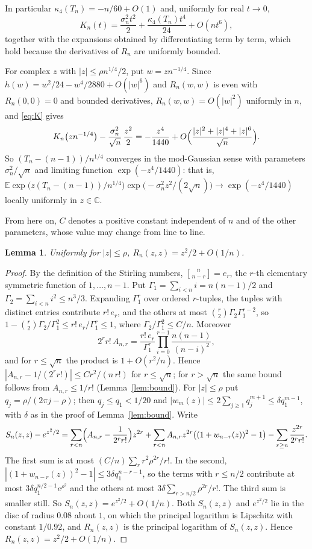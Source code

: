 \documentclass[11pt]{amsart}
\newtheorem{lemma}[theorem]{Lemma}
\theoremstyle{remark}
\newcommand{\E}{\mathbb{E}}
\newcommand{\stirl}[2]{\genfrac{[}{]}{0pt}{}{#1}{#2}}
\begin{document}
In particular $\kappa_4(T_n)=-n/60+O(1)$ and, uniformly for real $t\to0$,
\begin{equation}\label{eq:Kexp}
K_n(t)=\frac{\sigma_n^2t^2}2+\frac{\kappa_4(T_n)t^4}{24}+O(nt^6),
\end{equation}
together with the expansions obtained by differentiating term by term, which hold because the derivatives of $R_n$ are uniformly bounded.

For complex $z$ with $|z|\le\rho n^{1/4}/2$, put $w=zn^{-1/4}$. Since $h(w)=w^2/24-w^4/2880+O(|w|^6)$ and $R_n(w,w)$ is even with $R_n(0,0)=0$ and bounded derivatives, $R_n(w,w)=O(|w|^2)$ uniformly in $n$, and \eqref{eq:K} gives
\[
K_n\bigl(zn^{-1/4}\bigr)-\frac{\sigma_n^2}{\sqrt n}\,\frac{z^2}2=-\frac{z^4}{1440}+O\Bigl(\frac{|z|^2+|z|^4+|z|^6}{\sqrt n}\Bigr).
\]
So $(T_n-(n-1))/n^{1/4}$ converges in the mod-Gaussian sense with parameters $\sigma_n^2/\sqrt n$ and limiting function $\exp(-z^4/1440)$: that is, $\E\exp\bigl(z(T_n-(n-1))/n^{1/4}\bigr)\exp\bigl(-\sigma_n^2z^2/(2\sqrt n)\bigr)\to\exp(-z^4/1440)$ locally uniformly in $z\in\mathbb{C}$.

From here on, $C$ denotes a positive constant independent of $n$ and of the other parameters, whose value may change from line to line.

\begin{lemma}\label{lem:rate}
Uniformly for $|z|\le\rho$, $R_n(z,z)=z^2/2+O(1/n)$.
\end{lemma}

\begin{proof}
By the definition of the Stirling numbers, $\stirl{n}{n-r}=e_r$, the $r$-th elementary symmetric function of $1,\dots,n-1$. Put $\Gamma_1=\sum_{i<n}i=n(n-1)/2$ and $\Gamma_2=\sum_{i<n}i^2\le n^3/3$. Expanding $\Gamma_1^r$ over ordered $r$-tuples, the tuples with distinct entries contribute $r!\,e_r$, and the others at most $\binom r2\Gamma_2\Gamma_1^{r-2}$, so $1-\binom r2\Gamma_2/\Gamma_1^2\le r!\,e_r/\Gamma_1^r\le1$, where $\Gamma_2/\Gamma_1^2\le C/n$. Moreover
\[
2^rr!\,A_{n,r}=\frac{r!\,e_r}{\Gamma_1^r}\prod_{i=0}^{r-1}\frac{n(n-1)}{(n-i)^2},
\]
and for $r\le\sqrt n$ the product is $1+O(r^2/n)$. Hence $|A_{n,r}-1/(2^rr!)|\le Cr^2/(n\,r!)$ for $r\le\sqrt n$; for $r>\sqrt n$ the same bound follows from $A_{n,r}\le1/r!$ (Lemma~\ref{lem:bound}). For $|z|\le\rho$ put $q_j=\rho/(2\pi j-\rho)$; then $q_j\le q_1<1/20$ and $|w_m(z)|\le2\sum_{j\ge1}q_j^{m+1}\le\delta q_1^{m-1}$, with $\delta$ as in the proof of Lemma~\ref{lem:bound}. Write
\[
S_n(z,z)-e^{z^2/2}=\sum_{r<n}\Bigl(A_{n,r}-\frac1{2^rr!}\Bigr)z^{2r}+\sum_{r<n}A_{n,r}z^{2r}\bigl((1+w_{n-r}(z))^2-1\bigr)-\sum_{r\ge n}\frac{z^{2r}}{2^rr!}.
\]
The first sum is at most $(C/n)\sum_rr^2\rho^{2r}/r!$. In the second, $|(1+w_{n-r}(z))^2-1|\le3\delta q_1^{n-r-1}$, so the terms with $r\le n/2$ contribute at most $3\delta q_1^{n/2-1}e^{\rho^2}$ and the others at most $3\delta\sum_{r>n/2}\rho^{2r}/r!$. The third sum is smaller still. So $S_n(z,z)=e^{z^2/2}+O(1/n)$. Both $S_n(z,z)$ and $e^{z^2/2}$ lie in the disc of radius $0.08$ about $1$, on which the principal logarithm is Lipschitz with constant $1/0.92$, and $R_n(z,z)$ is the principal logarithm of $S_n(z,z)$. Hence $R_n(z,z)=z^2/2+O(1/n)$.
\end{proof}
\end{document}
